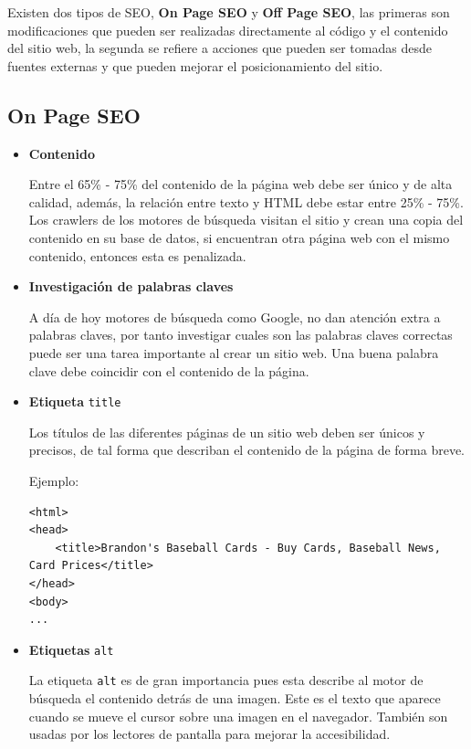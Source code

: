 \documentclass[12pt]{llncs}
\begin{document}
Existen dos tipos de SEO, \textbf{On Page SEO} y \textbf{Off Page SEO}, las primeras son modificaciones que pueden ser realizadas directamente al código y el contenido del sitio web, la segunda se refiere a acciones que pueden ser tomadas desde fuentes externas y que pueden mejorar el posicionamiento del sitio.

\subsection{On Page SEO}

\begin{itemize}
\item \textbf{Contenido}

Entre el 65\% - 75\% del contenido de la página web debe ser único y de alta calidad, además, la relación entre texto y HTML debe estar entre 25\% - 75\%. Los crawlers de los motores de búsqueda visitan el sitio y crean una copia del contenido en su base de datos, si encuentran otra página web con el mismo contenido, entonces esta es penalizada.

\item \textbf{Investigación de palabras claves}

A día de hoy motores de búsqueda como Google, no dan atención extra a palabras claves, por tanto investigar cuales son las palabras claves correctas puede ser una tarea importante al crear un sitio web. Una buena palabra clave debe coincidir con el contenido de la página.

\item \textbf{Etiqueta} \verb+title+

Los títulos de las diferentes páginas de un sitio web deben ser únicos y precisos, de tal forma que describan el contenido de la página de forma breve.

Ejemplo:
\begin{lstlisting}
<html>
<head>
    <title>Brandon's Baseball Cards - Buy Cards, Baseball News, Card Prices</title>
</head>
<body>
...
\end{lstlisting}

\item \textbf{Etiquetas} \verb+alt+

La etiqueta \verb+alt+ es de gran importancia pues esta describe al motor de búsqueda el contenido detrás de una imagen. Este es el texto que aparece cuando se mueve el cursor sobre una imagen en el navegador. También son usadas por los lectores de pantalla para mejorar la accesibilidad.


\end{itemize}
\end{document}
